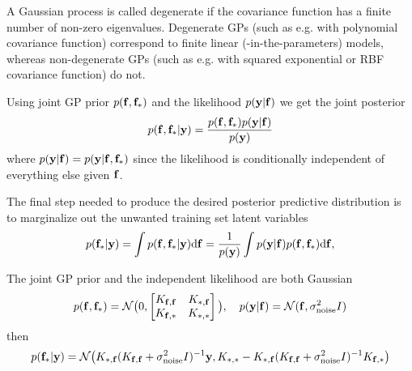 \documentclass[10pt]{elegantbook}
\begin{document}
\begin{definition}[Degenerate GP]
    A Gaussian process is called degenerate if the covariance function has a finite number
of non-zero eigenvalues. Degenerate GPs (such as e.g. with polynomial covariance function) correspond to finite linear
(-in-the-parameters) models, whereas non-degenerate GPs (such as e.g. with squared exponential
or RBF covariance function) do not.
\end{definition}

Using joint GP prior $p({\bf f}, {\bf f_{\ast}})$ and the likelihood $p({\bf y} | {\bf f})$ we get the joint posterior
\begin{equation}
    p({\bf f},{\bf f}_{*}|{\bf y})=\frac{p({\bf f},{\bf f}_{*})p({\bf y}|{\bf f})}{p({\bf y})}
\end{equation}
where $p({\bf y} | {\bf f}) = p({\bf y} | {\bf f}, {\bf f_{\ast}})$ since the likelihood is conditionally independent
of everything else given $\bf f$.

The final step needed to produce the desired posterior predictive distribution is to marginalize out
the unwanted training set latent variables
\begin{equation}
    p({\bf f}_{*}|{\bf y})
    =\int p({\bf f},{\bf f}_{*}|{\bf y})\mathrm{d}{\bf f}
    =\frac{1}{p({\bf y})}\int p({\bf y}|{\bf f})p({\bf f},{\bf f}_{*})\mathrm{d}{\bf f},
\end{equation}

The joint GP prior and the independent likelihood are both Gaussian
\begin{equation}
    p({\bf f},{\bf f}_{*}) = \mathcal N \big ( 0, 
    \begin{bmatrix}
        K_{{\bf f}, {\bf f}} & K_{{*}, {\bf f}} \\
        K_{{\bf f}, {*}} & K_{{*}, {*}}
    \end{bmatrix} \big ), \quad
    p({\bf y} | {\bf f}) = \mathcal N({\bf f}, \sigma_{\mathrm{noise}}^{2} I)
\end{equation}
then
\begin{equation}
    p({\bf f}_{*}|{\bf y})=
    \mathcal{N} \big (K_{{*}, {\bf f}} (K_{{\bf f}, {\bf f}} + \sigma_{\mathrm{noise}}^{2} I)^{-1}{\bf y},
    K_{{*}, {*}} - K_{{*}, {\bf f}}(K_{{\bf f}, {\bf f}} + \sigma_{\mathrm{noise}}^{2} I)^{-1} K_{{\bf f}, {*}} \big )
\end{equation}
\end{document}
